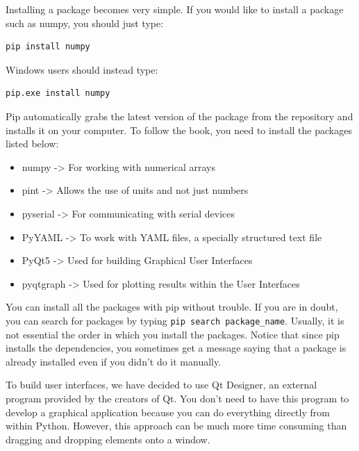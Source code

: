
Installing a package becomes very simple. If you would like to install a package such as numpy, you should just type:
\begin{verbatim}
pip install numpy
\end{verbatim}

Windows users should instead type:
\begin{verbatim}
pip.exe install numpy
\end{verbatim}


Pip automatically grabs the latest version of the package from the repository and installs it on your computer. To follow the book, you need to install the packages listed below:
\begin{itemize}
 \item numpy -> For working with numerical arrays
 \item pint -> Allows the use of units and not just numbers
 \item pyserial -> For communicating with serial devices
 \item PyYAML -> To work with YAML files, a specially structured text file
 \item PyQt5 -> Used for building Graphical User Interfaces
 \item pyqtgraph -> Used for plotting results within the User Interfaces
\end{itemize}

\sloppy You can install all the packages with pip without trouble. If you are in doubt, you can search for packages by typing \texttt{pip search package_name}. Usually, it is not essential the order in which you install the packages. Notice that since pip installs the dependencies, you sometimes get a message saying that a package is already installed even if you didn't do it manually.

To build user interfaces, we have decided to use Qt Designer, an external program provided by the creators of Qt. You don't need to have this program to develop a graphical application because you can do everything directly from within Python. However, this approach can be much more time consuming than dragging and dropping elements onto a window.

